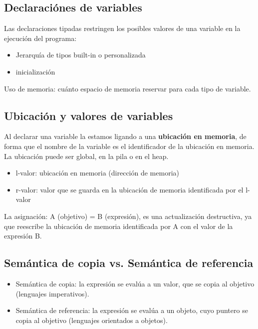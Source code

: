 \documentclass[10pt,a4paper]{report}
\begin{document}
        \subsection{Declaraciónes de variables}

            \par Las declaraciones tipadas restringen los posibles valores de una variable en la ejecución del programa:
                
                \begin{itemize}
                    \item Jerarquía de tipos built-in o personalizada
                    \item inicialización
            \end{itemize}
                
            \par Uso de memoria: cuánto espacio de memoria reservar para cada tipo de variable.
              
        \subsection{Ubicación y valores de variables}
            \par Al declarar una variable la estamos ligando a una \textbf{ubicación en memoria}, de forma que el nombre 
                de la 
                variable es el identificador de la ubicación en memoria. La ubicación puede ser global, en la pila o en el 
                heap.
            \begin{itemize}
                \item l-valor: ubicación en memoria (dirección de memoria)
                \item r-valor: valor que se guarda en la ubicación de memoria 
                identificada por el l-valor
            \end{itemize}
                
            \par La asignación: A (objetivo) = B (expresión), es una actualización destructiva, ya que reescribe la ubicación 
                de memoria identificada por A con el valor de la expresión B.

        \subsection{Semántica de copia vs. Semántica de referencia}
                \begin{itemize}
                    \item Semántica de copia: la expresión se evalúa a un valor, que se copia al objetivo (lenguajes 
                        imperativos).
                    \item Semántica de referencia: la expresión se evalúa a un objeto, cuyo puntero se copia al objetivo
                        (lenguajes orientados a objetos).
                \end{itemize}
\end{document}
